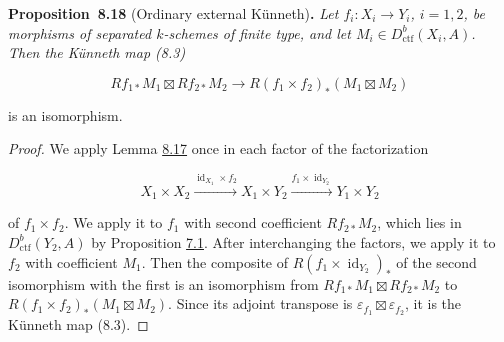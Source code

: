 \documentclass[11pt]{article}
\newenvironment{bpstatement}[2]{\par\addvspace{0.6\baselineskip}\noindent\textbf{#1}#2\textbf{.}\enspace\ignorespaces}
  {\par\addvspace{0.4\baselineskip}}
\newenvironment{bpstatementit}[2]{\begin{bpstatement}{#1}{#2}\itshape\ignorespaces}{\end{bpstatement}}
\begin{document}
\label{bp700}%
\begin{bpstatementit}{Proposition~8.18}{ (Ordinary external Künneth)}
Let \(f_i:X_i\to Y_i\), \(i=1,2\), be morphisms of separated \(k\)-schemes of finite type, and let \(M_i\in D^b_{\mathrm{ctf}}(X_i,A)\). Then the Künneth map (8.3)

\[
Rf_{1*}M_1\boxtimes Rf_{2*}M_2
\longrightarrow R(f_1\times f_2)_*(M_1\boxtimes M_2)
\]

is an isomorphism.
\end{bpstatementit}

\begin{proof}[{Proof}]\label{bp701}%
We apply Lemma \hyperref[bp698]{8.17} once in each factor of the factorization

\[
X_1\times X_2\xrightarrow{\operatorname{id}_{X_1}\times f_2}
X_1\times Y_2\xrightarrow{f_1\times\operatorname{id}_{Y_2}}
Y_1\times Y_2
\]

of \(f_1\times f_2\). We apply it to \(f_1\) with second coefficient \(Rf_{2*}M_2\), which lies in \(D^b_{\mathrm{ctf}}(Y_2,A)\) by Proposition \hyperref[bp605]{7.1}. After interchanging the factors, we apply it to \(f_2\) with coefficient \(M_1\). Then the composite of \(R(f_1\times\operatorname{id}_{Y_2})_*\) of the second isomorphism with the first is an isomorphism from \(Rf_{1*}M_1\boxtimes Rf_{2*}M_2\) to \(R(f_1\times f_2)_*(M_1\boxtimes M_2)\). Since its adjoint transpose is \(\varepsilon_{f_1}\boxtimes\varepsilon_{f_2}\), it is the Künneth map (8.3).
\end{proof}




\clearpage{}\hypertarget{bp-outside}{}%
\end{document}
